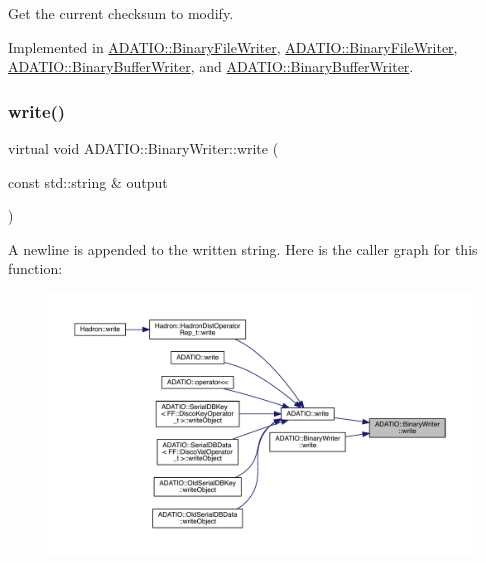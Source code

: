 Get the current checksum to modify. 



Implemented in \mbox{\hyperlink{classADATIO_1_1BinaryFileWriter_a0137ec5926d08e49ed7a63c6ef33e882}{A\+D\+A\+T\+I\+O\+::\+Binary\+File\+Writer}}, \mbox{\hyperlink{classADATIO_1_1BinaryFileWriter_a0137ec5926d08e49ed7a63c6ef33e882}{A\+D\+A\+T\+I\+O\+::\+Binary\+File\+Writer}}, \mbox{\hyperlink{classADATIO_1_1BinaryBufferWriter_af4cc523a862ce29a96f1a813f254360e}{A\+D\+A\+T\+I\+O\+::\+Binary\+Buffer\+Writer}}, and \mbox{\hyperlink{classADATIO_1_1BinaryBufferWriter_af4cc523a862ce29a96f1a813f254360e}{A\+D\+A\+T\+I\+O\+::\+Binary\+Buffer\+Writer}}.

\mbox{\label{classADATIO_1_1BinaryWriter_ac7731874e4949f80f0edbad2474c4b64}} 
\subsubsection{\texorpdfstring{write()}{write()}\hspace{0.1cm}{\footnotesize\ttfamily [1/24]}}
{\footnotesize\ttfamily virtual void A\+D\+A\+T\+I\+O\+::\+Binary\+Writer\+::write (\begin{DoxyParamCaption}\item[{const std\+::string \&}]{output }\end{DoxyParamCaption})\hspace{0.3cm}{\ttfamily [virtual]}}

A newline is appended to the written string. Here is the caller graph for this function\+:\nopagebreak
\begin{figure}[H]
\begin{center}
\leavevmode
\includegraphics[width=350pt]{db/dee/classADATIO_1_1BinaryWriter_ac7731874e4949f80f0edbad2474c4b64_icgraph}
\end{center}
\end{figure}
\mbox{\label{classADATIO_1_1BinaryWriter_ac7731874e4949f80f0edbad2474c4b64}} 

